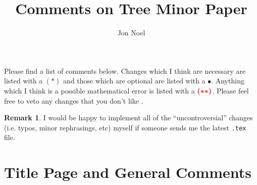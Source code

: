 \documentclass[11 pt]{article}
\title{Comments on Tree Minor Paper}
\author{Jon Noel}
\date{}
\theoremstyle{definition}
\newtheorem{rem}{Remark}
\theoremstyle{case}
\numberwithin{equation}{section}
\begin{document}
\maketitle

Please find a list of comments below. Changes which I think are necessary are listed with a $\boldsymbol{(*)}$ and those which are optional are listed with a $\bullet$. Anything which I think is a possible mathematical error is listed with a $\color{red}{\boldsymbol{(**)}}$. Please feel free to veto any changes that you don't like \smiley{}.

\begin{rem}
I would be happy to implement all of the ``uncontroversial'' changes (i.e. typos, minor rephrasings, etc) myself if someone sends me the latest \texttt{.tex} file.  
\end{rem}

\addtocounter{section}{-1}
\section{Title Page and General Comments}
\end{document}
